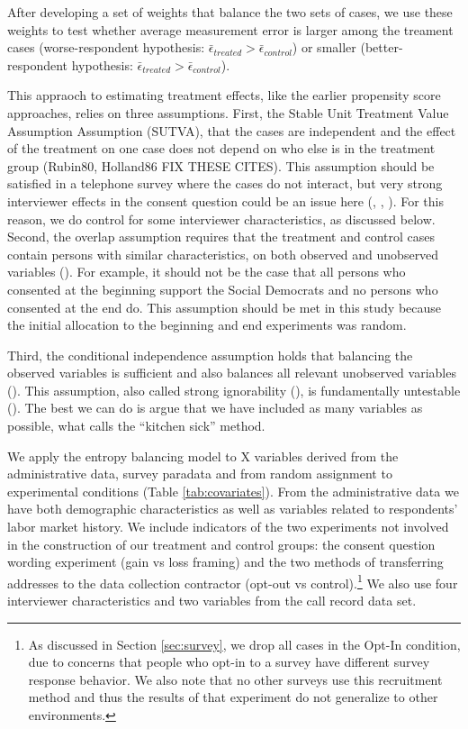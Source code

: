 After developing a set of weights that balance the two sets of cases, we use these weights to test whether average measurement error is larger among the treament cases (worse-respondent hypothesis: $\bar{\epsilon}_{treated} > \bar{\epsilon}_{control}$) or smaller (better-respondent hypothesis: $\bar{\epsilon}_{treated} > \bar{\epsilon}_{control}$).

This appraoch to estimating treatment effects, like the earlier propensity score approaches, relies on three assumptions. First, the Stable Unit Treatment Value Assumption  Assumption (SUTVA), that the cases are independent and the effect of the treatment on one case does not depend on who else is in the treatment group (Rubin80, Holland86 FIX THESE CITES). This assumption should be satisfied in a telephone survey where the cases do not interact, but very strong interviewer effects in the consent question could be an issue here (\cite{Beste11}, \cite{Sakshaugetal13}, \cite{Salaetal10}). For this reason, we do control for some interviewer characteristics, as discussed below. Second, the overlap assumption requires that the treatment and control cases contain persons with similar characteristics, on both observed and unobserved variables (\cite{Heckmanetal98}). For example, it should not be the case that all persons who consented at the beginning support the Social Democrats and no persons who consented at the end do. This assumption should be met in this study because the initial allocation to the beginning and end experiments was random. 

Third, the conditional independence assumption holds that balancing the observed variables is sufficient and also balances all relevant unobserved variables (\cite{Imbens14}). This assumption, also called strong ignorability (\cite{Stuart10}), is fundamentally untestable (\cite{Imbens04}). The best we can do is argue that we have included as many variables as possible, what \cite{Stuart10} calls the ``kitchen sick'' method.

We apply the entropy balancing model to X variables derived from the administrative data, survey paradata and from random assignment to experimental conditions (Table \ref{tab:covariates}). From the administrative data we have both demographic characteristics as well as  variables related to respondents' labor market history. We include indicators of the two experiments not involved in the construction of our treatment and control groups: the consent question wording experiment (gain vs loss framing) and the two methods of transferring addresses to the data collection contractor (opt-out vs control).\footnote{As discussed in Section \ref{sec:survey}, we drop all cases in the Opt-In condition, due to concerns that people who opt-in to a survey have different survey response behavior. We also note that no other surveys use this recruitment method and thus the results of that experiment do not generalize to other environments.} We also use four interviewer characteristics and two variables from the call record data set. 

